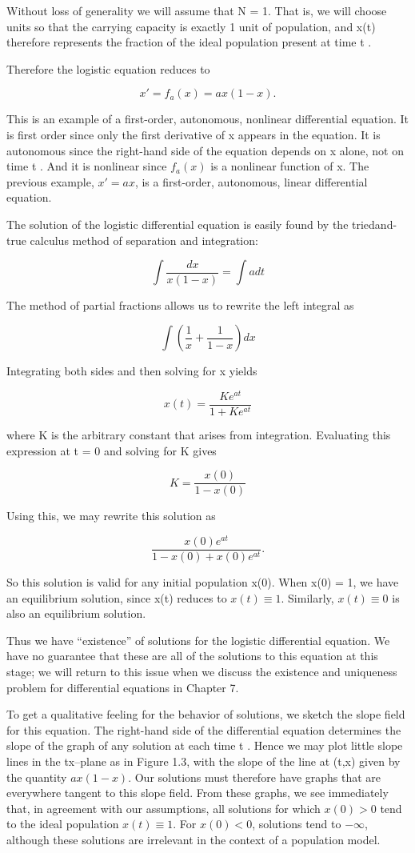 \documentclass[12pt]{article}
\begin{document}
Without loss of generality we will assume that N = 1. That is, we will
choose units so that the carrying capacity is exactly 1 unit of population, and
x(t) therefore represents the fraction of the ideal population present at time t .

Therefore the logistic equation reduces to

\[
x' = f_a(x) = ax(1 - x).
\]

This is an example of a first-order, autonomous, nonlinear differential equation.
It is first order since only the first derivative of x appears in the equation.
It is autonomous since the right-hand side of the equation depends on x alone,
not on time t . And it is nonlinear since $f_a(x)$ is a nonlinear function of x. The
previous example, $x'= ax$, is a first-order, autonomous, linear differential
equation.

The solution of the logistic differential equation is easily found by the triedand-true calculus method of separation and integration:

\[
\int \frac{dx}{x(1-x)} = \int a dt
\]

The method of partial fractions allows us to rewrite the left integral as

\[
\int (\frac{1}{x} + \frac{1}{1-x}) dx
\]

Integrating both sides and then solving for x yields

\[
x(t) = \frac{K e^{at}}{1+ Ke^{at}}
\]

where K is the arbitrary constant that arises from integration. Evaluating this
expression at t = 0 and solving for K gives

\[
K = \frac{x(0)}{1 - x(0)}
\]

Using this, we may rewrite this solution as

\[
\frac{x(0)e^{at}}{1 - x(0) + x(0)e^{at}} .
\]


So this solution is valid for any initial population x(0). When x(0) = 1,
we have an equilibrium solution, since x(t) reduces to $x(t) \equiv 1$. Similarly,
$x(t) \equiv 0$ is also an equilibrium solution.

Thus we have “existence” of solutions for the logistic differential equation.
We have no guarantee that these are all of the solutions to this equation at this
stage; we will return to this issue when we discuss the existence and uniqueness
problem for differential equations in Chapter 7.

To get a qualitative feeling for the behavior of solutions, we sketch the
slope field for this equation. The right-hand side of the differential equation
determines the slope of the graph of any solution at each time t . Hence we
may plot little slope lines in the tx–plane as in Figure 1.3, with the slope of the
line at (t,x) given by the quantity $ax(1 - x)$. Our solutions must therefore
have graphs that are everywhere tangent to this slope field. From these graphs,
we see immediately that, in agreement with our assumptions, all solutions
for which $x(0) > 0$ tend to the ideal population $x(t) \equiv 1$. For $x(0) < 0$,
solutions tend to $- \infty$, although these solutions are irrelevant in the context
of a population model.
\end{document}
